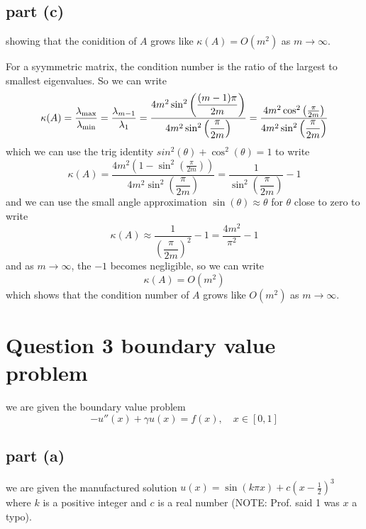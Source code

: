 \documentclass[12pt]{article}
\begin{document}
\subsection{part (c)}
showing that the conidition of $A$ grows like $\kappa(A) = O(m^2)$ as $m \to \infty$.

For a syymmetric matrix, the condition number is the ratio of the largest to smallest eigenvalues. So we can write
\begin{equation}
    \kappa(A) = \dfrac{\lambda_{\rm max}}{\lambda_{\rm  min}} = \dfrac{\lambda_{m-1}}{\lambda_1} = \dfrac{4 m^2 \sin^2\left(\dfrac{(m-1) \pi}{2m}\right)}{4 m^2 \sin^2\left(\dfrac{\pi}{2m}\right)} = \dfrac{4 m^2 \cos^2 \left( \frac{\pi}{2m}\right)}{4 m^2 \sin^2\left(\dfrac{\pi}{2m}\right)} 
\end{equation}
which we can use the trig identity $sin^2(\theta) + \cos^2(\theta) = 1$ to write
\begin{equation}
    \kappa(A) = \dfrac{4 m^2 (1 - \sin^2 \left( \frac{\pi}{2m}\right))}{4 m^2 \sin^2\left(\dfrac{\pi}{2m}\right)} = \dfrac{1}{\sin^2\left(\dfrac{\pi}{2m}\right)} - 1
\end{equation}
and we can use the small angle approximation $\sin(\theta) \approx \theta$ for $\theta$ close to zero to write
\begin{equation}
    \kappa(A) \approx \dfrac{1}{\left(\dfrac{\pi}{2m}\right)^2} - 1 = \dfrac{4 m^2}{\pi^2} - 1
\end{equation}
and as $m \to \infty$, the $-1$ becomes negligible, so we can write
\begin{equation}
    \kappa(A) = O(m^2)
\end{equation}
which shows that the condition number of $A$ grows like $O(m^2)$ as $m \to \infty$.


\section{Question 3 boundary value problem}
we are given the boundary value problem
\begin{equation}
    -u''(x) + \gamma u(x) = f(x), \quad x \in [0, 1]
\end{equation}

\subsection{part (a)}
we are given the manufactured solution $u(x) = \sin(k \pi x) + c (x - \frac{1}{2})^3$ where $k$ is a positive integer and $c$ is a  real number (NOTE: Prof. said 1 was $x$ a typo).
\end{document}
